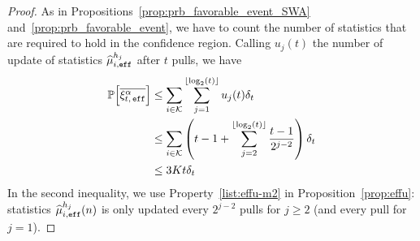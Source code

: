 \begin{proof}
As in Propositions~\ref{prop:prb_favorable_event_SWA} and~\ref{prop:prb_favorable_event}, we have to count the number of statistics that are required to hold in the confidence region. Calling $u_j(t)$ the number of update of statistics $\widehat{\mu}_{i,\texttt{eff}}^{h_j}$ after $t$ pulls, we have
\begin{align*}
    \mathbb{P}\Big[\overline{\xi^\alpha_{t,\, \texttt{eff}}}\Big] &\leq \sum_{i \in \mathcal{K}} \sum_{j=1}^{\left\lfloor\log_2\left(t\right)\right\rfloor} u_j(t) \delta_t \\
    &\leq \sum_{i \in \mathcal{K}} \left(t - 1  + \sum_{j=2}^{\left\lfloor\log_2\left(t\right)\right\rfloor} \frac{t-1}{2^{j-2}}\right) \delta_t \\
    &\leq 3Kt\delta_t
\end{align*}
In the second inequality, we use Property~\ref{list:effu-m2} in Proposition~\ref{prop:effu}: statistics $\widehat{\mu}_{i,\texttt{eff}}^{h_j}(n)$ is only updated every $2^{j-2}$ pulls for $j\geq 2$ (and every pull for $j=1$).
\end{proof}

